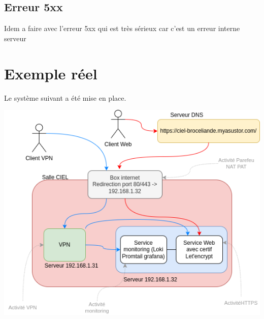 \documentclass[french, 12pt]{article}%
\newcommand{\itemE}{\item[$\bullet$]}
\newif\ifPROF
\begin{document}
\subsection{Erreur 5xx}

Idem a faire avec l'erreur 5xx qui est très sérieux car c'est un erreur interne serveur

\ifPROF
\color{red}
Le principe est le même que précdement mais il faudra modifier le serveur pour créer une erreur 500. Par exemple : 

\begin{itemize}
\itemE retour forcé via configuration Nginx
\end{itemize}

\begin{lstlisting}[style=commande]
location /error500 {
    return 500;
}
\end{lstlisting}
Puis, fais une requête sur /error500


\begin{itemize}
\itemE  Erreur 502 : Bad Gateway
\end{itemize}
Configure Nginx pour faire du reverse proxy vers un service qui n’existe pas ou qui ne tourne pas.

\begin{lstlisting}[style=commande]
location /error502 {
    proxy_pass http://localhost:9999;  # Port non utilisé volontairement
}
\end{lstlisting}

\normalcolor
\fi

\newpage
\section{Exemple réel}

Le système suivant a été mise en place. 

\begin{center}
\includegraphics[scale=0.5]{./ressource/topoReseau.drawio.png}
\end{center}
\end{document}
